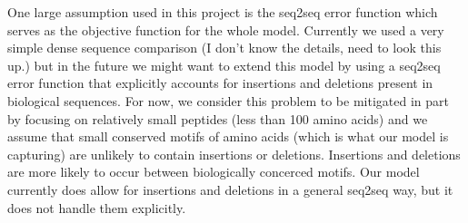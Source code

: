 \documentclass[preprint,12pt]{elsarticle}
\begin{document}
One large assumption used in this project is the seq2seq error function which serves as the objective function for the whole model. Currently we used a very simple dense sequence comparison (I don't know the details, need to look this up.) but in the future we might want to extend this model by using a seq2seq error function that explicitly accounts for insertions and deletions present in biological sequences. For now, we consider this problem to be mitigated in part by focusing on relatively small peptides (less than 100 amino acids) and we assume that small conserved motifs of amino acids (which is what our model is capturing) are unlikely to contain insertions or deletions. Insertions and deletions are more likely to occur between biologically concerced motifs. Our model currently does allow for insertions and deletions in a general seq2seq way, but it does not handle them explicitly.









\end{document}
